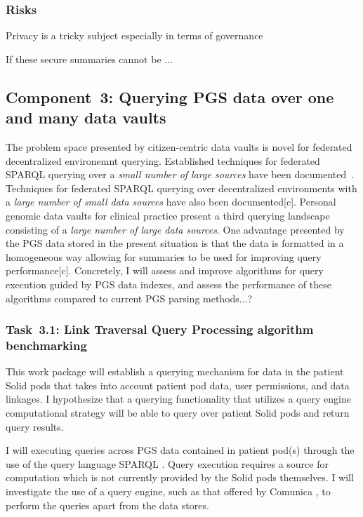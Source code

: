 \documentclass[a4paper,11pt]{article}
\begin{document}
\begin{refsection}
\subsubsection{Risks}
Privacy is a tricky subject especially in terms of governance

If these secure summaries cannot be ...


\newcommand\WPc{Querying PGS data over one and many data vaults}
\subsection{Component~3: \WPc}

The problem space presented by citizen-centric data vaults is novel for federated decentralized environemnt querying. 
Established techniques for federated SPARQL querying over a \emph{small number of large sources} have been documented~\cite{hibiscus, tpf, sparql_adaptive_anapsid}.
Techniques for federated SPARQL querying over decentralized environments with a \emph{large number of small data sources} have also been documented[c].
Personal genomic data vaults for clinical practice present a third querying landscape consisting of a \emph{large number of large data sources}.
One advantage presented by the PGS data stored in the present situation is that the data is formatted in a homogeneous way allowing for summaries to be used for improving query performance[c].
Concretely, I will assess and improve algorithms for query execution guided by PGS data indexes,
and assess the performance of these algorithms compared to current PGS parsing methods...?

\newcommand\WPca{Link Traversal Query Processing algorithm benchmarking}
\subsubsection{Task~3.1: \WPca}

This work package will establish a querying mechanism for data in the patient Solid pods that takes into account patient pod data, user permissions, and data linkages. 
I hypothesize that a querying functionality that utilizes a query engine computational strategy will be able to query over patient Solid pods and return query results.

I will executing queries across PGS data contained in patient pod(s) through the use of the query language SPARQL \cite{noauthor_sparql_nodate}.
Query execution requires a source for computation which is not currently provided by the Solid pods themselves.
I will investigate the use of a query engine, such as that offered by Comunica \cite{comunica}, to perform the queries apart from the data stores.


\end{refsection}
\end{document}
